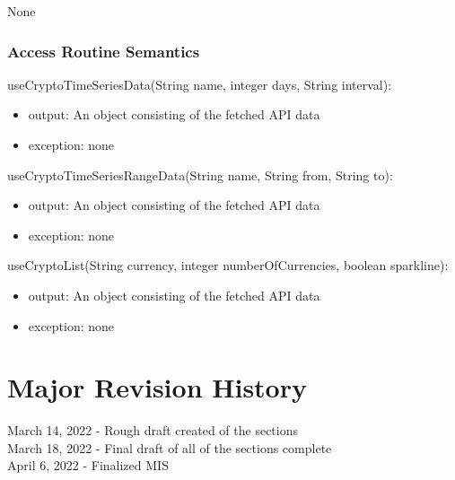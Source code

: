 \documentclass[12pt]{article}
\begin{document}
None

\subsubsection{Access Routine Semantics}


\noindent useCryptoTimeSeriesData(String name, integer days, String interval):
\begin{itemize}
\item output: An object consisting of the fetched API data
\item exception: none
\end{itemize}

\noindent useCryptoTimeSeriesRangeData(String name, String from, String to):
\begin{itemize}
\item output: An object consisting of the fetched API data
\item exception: none
\end{itemize}

\noindent useCryptoList(String currency, integer numberOfCurrencies, boolean sparkline):
\begin{itemize}
\item output: An object consisting of the fetched API data
\item exception: none
\end{itemize}

\newpage

\section{Major Revision History}
March 14, 2022 - Rough draft created of the sections \\
March 18, 2022 - Final draft of all of the sections complete \\
April 6, 2022 - Finalized MIS \\
\end{document}
